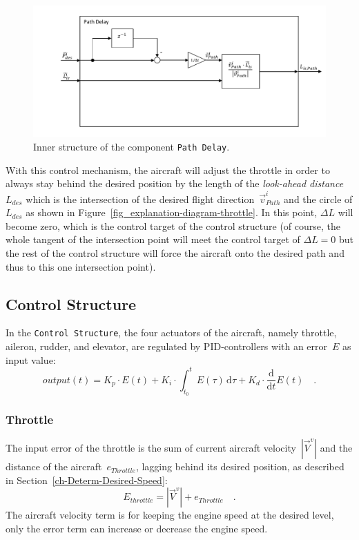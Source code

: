 \documentclass[11pt,a4paper]{scrartcl}		%
\begin{document}
\begin{figure}[tbh]
  \begin{center}
  	\includegraphics[width=14cm]{pictures/Path_Delay.pdf}
  \end{center}
  \caption{Inner structure of the component \texttt{Path Delay}.}
  \label{fig_Path_Delay}
\end{figure} 

With this control mechanism, the aircraft will adjust the throttle in order to always stay behind the desired position by the length of the \textsl{look-ahead distance}~$L_{des}$ which is the intersection of the desired flight direction~$\vec{v}_{Path}^i$ and the circle of $L_{des}$ as shown in Figure~\ref{fig_explanation-diagram-throttle}. In this point, $\Delta L$ will become zero, which is the control target of the control structure (of course, the whole tangent of the intersection point will meet the control target of $\Delta L = 0$ but the rest of the control structure will force the aircraft onto the desired path and thus to this one intersection point).  

\medskip





\subsection{Control Structure}

In the \texttt{Control Structure}, the four actuators of the aircraft, namely throttle, aileron, rudder, and elevator, are regulated by PID-controllers with an error~$E$ as input value:
\begin{equation}
output(t) = K_p \cdot E(t) + K_i \cdot \int_{t_0}^t E(\tau)\, \mathrm{d}\tau + K_d \cdot \frac{\mathrm{d}}{\mathrm{d}t}E(t)\quad .
\end{equation}

\subsubsection*{Throttle}
The input error of the throttle is the sum of current aircraft velocity~$|\vec{V}^v|$ and the distance of the aircraft~$e_{Throttle}$, lagging behind its desired position, as described in Section~\ref{ch-Determ-Desired-Speed}:
\begin{equation}
E_{throttle} = |\vec{V}^v| + e_{Throttle} \quad .
\end{equation} 
The aircraft velocity term is for keeping the engine speed at the desired level, only the error term can increase or decrease the engine speed.
\end{document}
